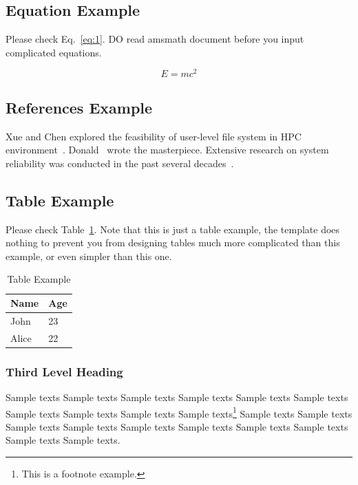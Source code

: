 \documentclass{ics}
\begin{document}
\subsection{Equation Example}
\label{sec:equation-example}
Please check Eq.~\eqref{eq:1}. DO read \textsf{amsmath} document before you
input complicated equations.

\begin{equation}
  \label{eq:1}
  E=mc^{2}
\end{equation}

\subsection{References Example}
\label{sec:ref-example}
Xue and Chen explored the feasibility of user-level file system in HPC
environment~\cite{xue08}. Donald~\cite{tex} wrote the masterpiece. Extensive
research on system reliability was conducted in the past several
decades~\cite{xue09,Chafik94,MellingerR96,NPB2}.

\subsection{Table Example}
\label{sec:table-example}
Please check Table~\ref{tab:example}. Note that this is just a table example,
the template does nothing to prevent you from designing tables much more
complicated than this example, or even simpler than this one.

\begin{table}[h]
  \centering
  \caption{Table Example}
  \label{tab:example}
  \begin{tabular}{l|l}
    \hline
    Name & Age \\
    \hline
    John & 23 \\
    \hline
    Alice & 22 \\
    \hline
  \end{tabular}
\end{table}

\subsubsection{Third Level Heading}
\label{sec:3rd-level-heading}
Sample texts Sample texts Sample texts Sample texts Sample texts Sample texts
Sample texts Sample texts Sample texts Sample texts\footnote{This is a footnote
  example.} Sample texts Sample texts Sample texts Sample texts Sample texts
Sample texts Sample texts Sample texts Sample texts Sample texts.
\end{document}
